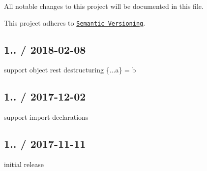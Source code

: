 All notable changes to this project will be documented in this file.

This project adheres to \href{http://semver.org/}{\tt Semantic Versioning}.

\subsection*{1.. / 2018-\/02-\/08}


\begin{DoxyItemize}
\item support object rest destructuring {\ttfamily \{...a\} = b}
\end{DoxyItemize}

\subsection*{1.. / 2017-\/12-\/02}


\begin{DoxyItemize}
\item support import declarations
\end{DoxyItemize}

\subsection*{1.. / 2017-\/11-\/11}


\begin{DoxyItemize}
\item initial release 
\end{DoxyItemize}